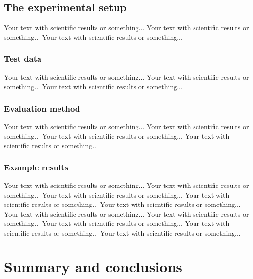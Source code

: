 \documentclass[final]{beamer}
\begin{document}
\begin{frame}[t]
\begin{multicols}{3}
\subsection{The experimental setup}

Your text with scientific results or something... 
Your text with scientific results or something... 
Your text with scientific results or something...

\subsubsection{Test data}
 
Your text with scientific results or something... 
Your text with scientific results or something... 
Your text with scientific results or something... 

\subsubsection{Evaluation method}
Your text with scientific results or something... 
Your text with scientific results or something... 
Your text with scientific results or something... 
Your text with scientific results or something... 



\subsubsection{Example results}
Your text with scientific results or something... 
Your text with scientific results or something... 
Your text with scientific results or something... 
Your text with scientific results or something... 
Your text with scientific results or something... 
Your text with scientific results or something... 
Your text with scientific results or something... 
Your text with scientific results or something... 
Your text with scientific results or something... 
Your text with scientific results or something... 

\section{Summary and conclusions}






\end{multicols}
\end{frame}
\end{document}
